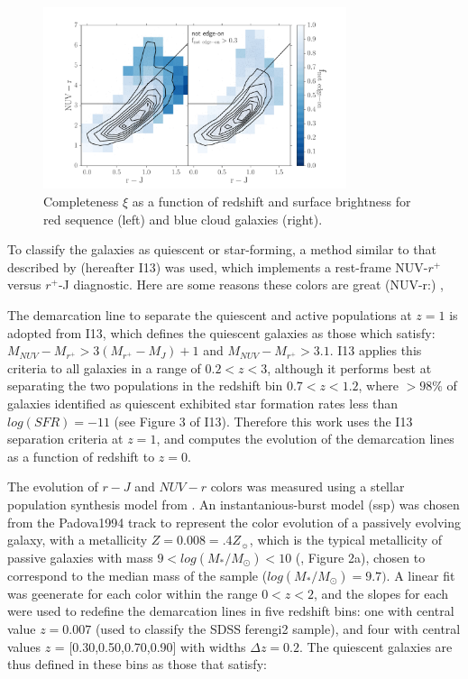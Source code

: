\documentclass[useAMS,usenatbib]{mn2e}
\begin{document}
\begin{figure}
\centering
\includegraphics[width=3.5in,trim={1cm 0cm 0cm 0cm},clip]{figures/edgeon_colorcolor.pdf}
\caption{Completeness $\xi$ as a function of redshift and surface brightness for red sequence (left) and blue cloud galaxies (right).}
\label{fig:edgeon}
\end{figure}
To classify the galaxies as quiescent or star-forming, a method similar to that described by \citet{Ilbert2013} (hereafter I13) was used, which implements a rest-frame NUV-$r^{+}$ versus $r^{+}$-J diagnostic. Here are some reasons these colors are great (NUV-r:) \citep{Arnouts2007a,Salim2005a,Wyder2007},\citep{Martin2007}

The demarcation line to separate the quiescent and active populations at $z=1$ is adopted from I13, which defines the quiescent galaxies as those which satisfy: $M_{NUV}-M_{r^{+}} > 3(M_{r^{+}}-M_{J})+1$ and $M_{NUV}-M_{r^{+}} > 3.1$. I13 applies this criteria to all galaxies in a range of $0.2<z<3$, although it performs best at separating the two populations in the redshift bin $0.7<z<1.2$, where $>98\%$ of galaxies identified as quiescent exhibited star formation rates less than $log(SFR) = -11$ (see Figure 3 of I13). Therefore this work uses the I13 separation criteria at $z=1$, and computes the evolution of the demarcation lines as a function of redshift to $z=0$. 

The evolution of $r-J$ and $NUV-r$ colors was measured using a stellar population synthesis model from \citet{Bruzual2003}. An instantanious-burst model (ssp) was chosen from the Padova1994 track to represent the color evolution of a passively evolving galaxy, with a metallicity $Z=0.008=.4Z_{\sun}$, which is the typical metallicity of passive galaxies with mass $9 < log(M_{*}/M_{\odot}) < 10$ (\citet{Peng2015}, Figure 2a), chosen to correspond to the median mass of the sample ($log(M_{*}/M_{\odot})=9.7)$. A linear fit was geenerate for each color within the range $0<z<2$, and the slopes for each were used to redefine the demarcation lines in five redshift bins: one with central value $z=0.007$ (used to classify the SDSS ferengi2 sample), and four with central values $z$ = [0.30,0.50,0.70,0.90] with widths $\Delta z=0.2$. The quiescent galaxies are thus defined in these bins as those that satisfy:
\end{document}
